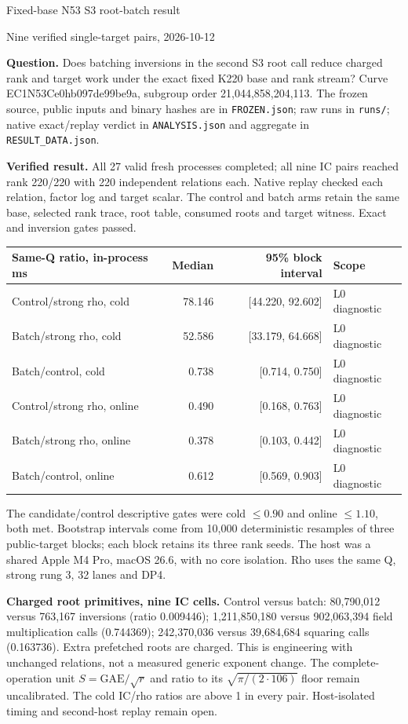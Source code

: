 \documentclass[10pt]{article}
\begin{document}
\begin{center}
{\Large Fixed-base N53 S3 root-batch result}\par
Nine verified single-target pairs, 2026-10-12
\end{center}
\noindent\textbf{Question.} Does batching inversions in the second S3
root call reduce charged rank and target work under the exact fixed K220
base and rank stream? Curve EC1N53Ce0hb097de99be9a, subgroup
order 21,044,858,204,113. The frozen source, public inputs and binary
hashes are in \texttt{FROZEN.json}; raw runs in \texttt{runs/};
native exact/replay verdict in \texttt{ANALYSIS.json} and aggregate in
\texttt{RESULT\_DATA.json}.

\smallskip
\noindent\textbf{Verified result.} All 27 valid fresh processes
completed; all nine IC pairs reached rank 220/220 with 220 independent
relations each. Native replay checked each relation, factor log and
target scalar. The control and batch arms retain the same base, selected
rank trace, root table, consumed roots and target witness. Exact and
inversion gates passed.

\begin{center}
\begin{tabular}{lrrl}
\toprule
Same-Q ratio, in-process ms & Median & 95\% block interval & Scope\\
\midrule
Control/strong rho, cold & 78.146 & [44.220, 92.602] & L0 diagnostic\\
Batch/strong rho, cold & 52.586 & [33.179, 64.668] & L0 diagnostic\\
Batch/control, cold & 0.738 & [0.714, 0.750] & L0 diagnostic\\
Control/strong rho, online & 0.490 & [0.168, 0.763] & L0 diagnostic\\
Batch/strong rho, online & 0.378 & [0.103, 0.442] & L0 diagnostic\\
Batch/control, online & 0.612 & [0.569, 0.903] & L0 diagnostic\\
\bottomrule
\end{tabular}
\end{center}
\noindent The candidate/control descriptive gates were cold
\(\leq 0.90\) and online \(\leq 1.10\), both met. Bootstrap intervals
come from 10,000 deterministic resamples of three public-target blocks;
each block retains its three rank seeds. The host was a shared Apple M4
Pro, macOS 26.6, with no core isolation. Rho uses the same Q, strong
rung 3, 32 lanes and DP4.

\smallskip
\noindent\textbf{Charged root primitives, nine IC cells.}
Control versus batch: 80,790,012 versus 763,167 inversions
(ratio 0.009446); 1,211,850,180 versus 902,063,394 field
multiplication calls (0.744369); 242,370,036 versus 39,684,684
squaring calls (0.163736). Extra prefetched roots are charged.
This is engineering with unchanged relations, not a measured generic
exponent change. The complete-operation unit
\(S=\mathrm{GAE}/\sqrt{r}\) and ratio to its
\(\sqrt{\pi/(2\cdot106)}\) floor remain uncalibrated.
The cold IC/rho ratios are above 1 in every pair.
Host-isolated timing and second-host replay remain open.
\end{document}
